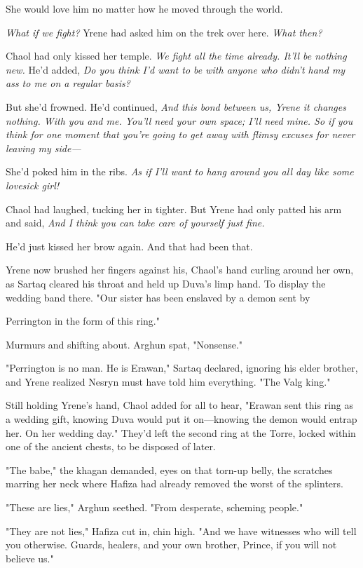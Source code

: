 She would love him no matter how he moved through the world.

\emph{What if we fight?} Yrene had asked him on the trek over here.
\emph{What then?}

Chaol had only kissed her temple. \emph{We fight all the time already. It'll be nothing new.} He'd added, \emph{Do you think I'd want to be with anyone who didn't hand my ass to me on a regular basis?}

But she'd frowned. He'd continued, \emph{And this bond between us, Yrene
 it changes nothing. With you and me. You'll need your own space; I'll need mine. So if you think for one moment that you're going to get away with flimsy excuses for never leaving my side---}

She'd poked him in the ribs. \emph{As if I'll want to hang around you all day like some lovesick girl!}

Chaol had laughed, tucking her in tighter. But Yrene had only patted his arm and said, \emph{And I think you can take care of yourself just fine.}

He'd just kissed her brow again. And that had been that.

Yrene now brushed her fingers against his, Chaol's hand curling around her own, as Sartaq cleared his throat and held up Duva's limp hand. To display the wedding band there. "Our sister has been enslaved by a demon sent by

Perrington in the form of this ring."

Murmurs and shifting about. Arghun spat, "Nonsense."

"Perrington is no man. He is Erawan," Sartaq declared, ignoring his elder brother, and Yrene realized Nesryn must have told him everything. "The Valg king."

Still holding Yrene's hand, Chaol added for all to hear, "Erawan sent this ring as a wedding gift, knowing Duva would put it on---knowing the demon would entrap her. On her wedding day." They'd left the second ring at the Torre, locked within one of the ancient chests, to be disposed of later.

"The babe," the khagan demanded, eyes on that torn-up belly, the scratches marring her neck where Hafiza had already removed the worst of the splinters.

"These are lies," Arghun seethed. "From desperate, scheming people."

"They are not lies," Hafiza cut in, chin high. "And we have witnesses who will tell you otherwise. Guards, healers, and your own brother, Prince, if you will not believe us."

